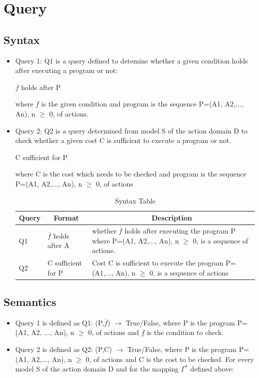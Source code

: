 \documentclass[11pt]{article}
\begin{document}
\section{Query}
\subsection{Syntax}
\begin{itemize}
\item{Query 1: Q1 is a query defined to detemine whether a given condition holds after executing a program or not:
\begin{center}
	$\overline{f}$ holds after P
\end{center}
where $\overline{f}$ is the given condition and program is the sequence P=(A1, A2,..., An), n $\geq$ 0, of actions.
}
\item{Query 2: Q2 is a query determined from model S of the action domain D to check whether a given cost C is sufficient to execute a program or not.
\begin{center}
	C sufficient for P
\end{center}
where C is the cost which needs to be checked and program is the sequence P=(A1, A2,..., An), n $\geq$ 0, of actions
}

\begin{table}[H]
	\centering
	\begin{tabular}{|p{2cm}|p{4cm}|p{7cm}|}
		\hline
		\multicolumn{1}{|c|}{\textbf{Query}} & \multicolumn{1}{c|}{\textbf{Format}} & \multicolumn{1}{c|}{\textbf{Description}} \\
		\hline
		Q1 & $\overline{f}$ holds after A & whether $\overline{f}$ holds after executing the program P where P=(A1, A2,..., An), n $\geq$ 0, is a sequence of actions.\\
		\hline
		Q2 & C sufficient for P & Cost C is sufficient to execute the program P=(A1,..., An), n $\geq$ 0, is a sequence of actions\\
		\hline
	\end{tabular}
	\caption{Syntax Table}
	\label{tab:table01}
\end{table}
\end{itemize}
\subsection{Semantics}
\begin{itemize}
	\item{Query 1 is defined as Q1: (P,$\overline{f}$) $\rightarrow$ True/False, where P is the program P=(A1, A2, ..., An), n $\geq$ 0, of actions and $\overline{f}$} is the condition to check. 
	\item{Query 2 is defined as Q2: (P,C) $\rightarrow$ True/False, where P is the program P=(A1, A2,..., An), n $\geq$ 0, of actions and C is the cost to be checked. For every model S of the action domain D and for the mapping $\Gamma^{\ast}$ defined above:}
\end{itemize}
\end{document}
